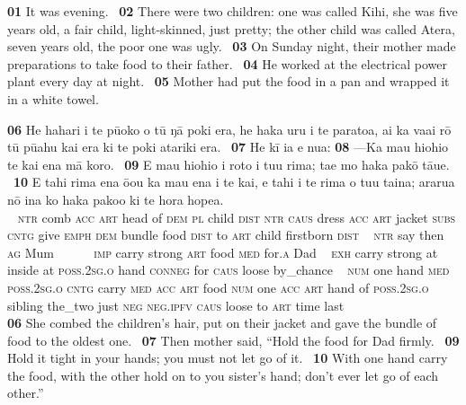 {\medskip\glt
\textbf{\textup{01}} It was evening. ~\textbf{\textup{02}} There were two children: one was called Kihi, she was five years old, a fair child, light-skinned, just pretty; the other child was called Atera, seven years old, the poor one was ugly. ~\textbf{\textup{03}} On Sunday night, their mother made preparations to take food to their father. ~\textbf{\textup{04}} He worked at the electrical power plant every day at night. ~\textbf{05} Mother had put the food in a pan and wrapped it in a white towel.
~

\bigskip\gll
\textbf{\textup{06}} He hahari i te pū{\ꞌ}oko o tū ŋā poki era, he haka uru i te paratoa, {\ꞌ}ai ka va{\ꞌ}ai rō tū pū{\ꞌ}ahu kai era ki te poki {\ꞌ}atariki era. ~\textbf{\textup{07}} He kī ia e nua: \textbf{\textup{08}} —Ka ma{\ꞌ}u hiohio te kai ena mā koro. ~\textbf{\textup{09}} E ma{\ꞌ}u hiohio {\ꞌ}i roto i tu{\ꞌ}u rima; ta{\ꞌ}e mo haka pakō tā{\ꞌ}ue. ~\textbf{\textup{10}} E tahi rima ena ō{\ꞌ}ou ka ma{\ꞌ}u ena i te kai, e tahi i te rima o tu{\ꞌ}u taina; ararua nō {\ꞌ}ina ko haka pako{\ꞌ}o ki te hora hope{\ꞌ}a.\\
~ \textsc{ntr} comb \textsc{acc} \textsc{art} head of \textsc{dem} \textsc{pl} child \textsc{dist} \textsc{ntr} \textsc{caus} dress \textsc{acc} \textsc{art} jacket \textsc{subs} \textsc{cntg} give \textsc{emph} \textsc{dem} bundle food \textsc{dist} to \textsc{art} child firstborn \textsc{dist} ~ \textsc{ntr} say then \textsc{ag} Mum ~ ~~~~\textsc{imp} carry strong \textsc{art} food \textsc{med} for\textsc{.a} Dad ~ \textsc{exh} carry strong at inside at \textsc{poss.2sg.o} hand \textsc{conneg} for \textsc{caus} loose by\_chance ~ \textsc{num} one hand \textsc{med} \textsc{poss.2sg.o} \textsc{cntg} carry \textsc{med} \textsc{acc} \textsc{art} food \textsc{num} one \textsc{acc} \textsc{art} hand of \textsc{poss.2sg.o} sibling the\_two just \textsc{neg} \textsc{neg.ipfv} \textsc{caus} loose to \textsc{art} time last\\
 
\medskip\glt
\textbf{\textup{06}} She combed the children’s hair, put on their jacket and gave the bundle of food to the oldest one. ~\textbf{\textup{07}} Then mother said, “Hold the food for Dad firmly. ~\textbf{\textup{09}} Hold it tight in your hands; you must not let go of it. ~\textbf{\textup{10}} With one hand carry the food, with the other hold on to you sister’s hand; don’t ever let go of each other.”

}
